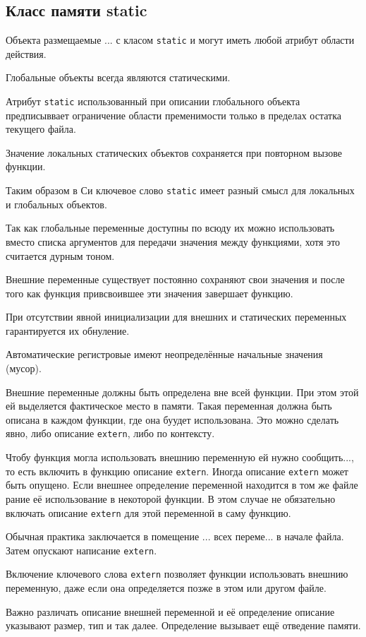 \subsection{Класс памяти static}

Объекта размещаемые ... с класом \texttt{static} и могут иметь любой атрибут области действия.

Глобальные объекты всегда являются статическими.

Атрибут \texttt{static} использованный при описании глобального объекта предписыввает ограничение области пременимости только в пределах остатка текущего файла.

Значение локальных статических объектов сохраняется при повторном вызове функции.

Таким образом в Си ключевое слово \texttt{static} имеет разный смысл для локальных и глобальных объектов.

Так как глобальные переменные доступны по всюду их можно использовать вместо списка аргументов для передачи значения между функциями, хотя это считается дурным тоном.

Внешние переменные существует постоянно сохраняют свои значения и после того как функция привсвоившее эти значения завершает функцию.

При отсутствии явной инициализации для внешних и статических переменных гарантируется их обнуление.

Автоматические регистровые имеют неопределённые начальные значения (мусор).

Внешние переменные должны быть определена вне всей функции. При этом этой ей выделяется фактическое место в памяти. Такая переменная должна быть описана в каждом функции, где она буудет использована. Это можно сделать явно, либо описание \texttt{extern}, либо по контексту.

Чтобу функция могла использовать внешнию переменную ей нужно сообщить..., то есть включить в функцию описание \texttt{extern}. Иногда описание \texttt{extern} может быть опущено. Если внешнее определение переменной находится в том же файле рание её использование в некоторой функции. В этом случае не обязательно включать описание \texttt{extern} для этой переменной в саму функцию.

 Обычная практика заключается в помещение ... всех переме... в начале файла. Затем опускают написание \texttt{extern}.

 Включение ключевого слова \texttt{extern} позволяет функции использовать внешнию переменную, даже если она определяется позже в этом или другом файле.

 Важно различать описание внешней переменной и её определение описание указывают размер, тип и так далее. Определение вызывает ещё отведение памяти.